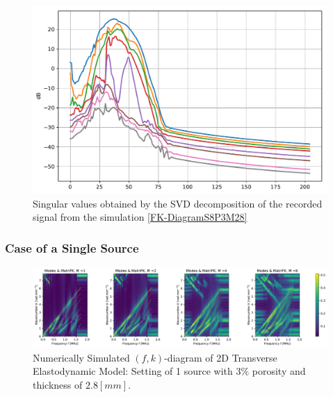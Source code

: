 \begin{figure}[!h]
	\centering
	\includegraphics[scale=.5]{images/TimeMultSous/2DTimeS8P3Elastic28_SV.pdf}
	\caption{Singular values obtained by the SVD decomposition of the recorded signal from the simulation \ref{FK-DiagramS8P3M28}}
	\label{SVD-S8P3M28}
\end{figure}



\subsubsection{Case of a Single Source}

\begin{figure}[!h]
	\centering
	\includegraphics[width=\textwidth]{images/TimeSingSous/2DTime_P7ElasticFK30M1460_y.pdf}
	\caption{Numerically Simulated $(f,k)$-diagram of 2D Transverse Elastodynamic Model: Setting of 1 source with $3\%$ porosity and thickness of $2.8 [mm]$.}
	\label{FK-DiagramS1P7M30}
\end{figure}

